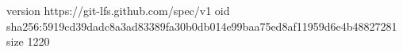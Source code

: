 version https://git-lfs.github.com/spec/v1
oid sha256:5919cd39dadc8a3ad83389fa30b0db014e99baa75ed8af11959d6e4b48827281
size 1220
